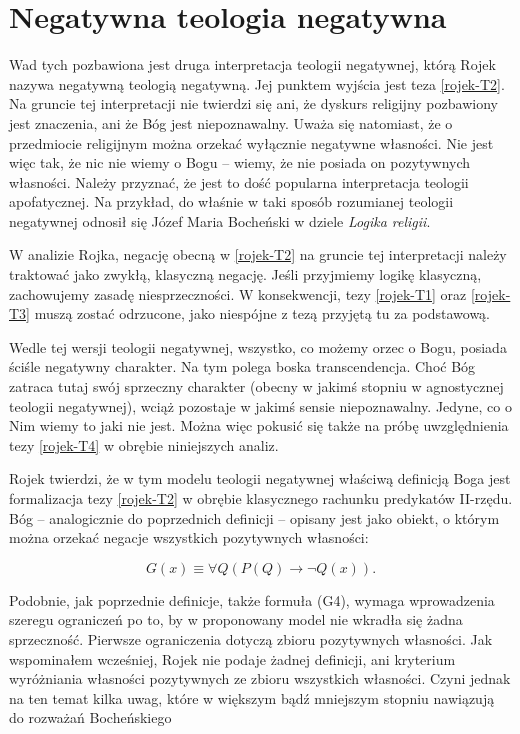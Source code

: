 \section{Negatywna teologia negatywna}

Wad tych pozbawiona jest druga interpretacja teologii negatywnej, którą
Rojek nazywa negatywną teologią negatywną. Jej punktem wyjścia jest
teza \eqref{rojek-T2}. Na gruncie tej interpretacji nie twierdzi się ani, że
dyskurs religijny pozbawiony jest znaczenia, ani że Bóg jest
niepoznawalny. Uważa się natomiast, że o przedmiocie religijnym można
orzekać wyłącznie negatywne własności. Nie jest więc tak, że nic nie
wiemy o Bogu -- wiemy, że nie posiada on pozytywnych własności. Należy
przyznać, że jest to dość popularna interpretacja teologii
apofatycznej. Na przykład, do właśnie w taki sposób rozumianej teologii
negatywnej odnosił się Józef Maria Bocheński w dziele \textit{Logika
religii}.

W analizie Rojka, negację obecną w \eqref{rojek-T2} na gruncie tej interpretacji
należy traktować jako zwykłą, klasyczną negację. Jeśli przyjmiemy
logikę klasyczną, zachowujemy zasadę niesprzeczności. W konsekwencji,
tezy \eqref{rojek-T1} oraz \eqref{rojek-T3} muszą zostać odrzucone, jako niespójne z tezą
przyjętą tu za podstawową.

Wedle tej wersji teologii negatywnej, wszystko, co możemy orzec o Bogu,
posiada ściśle negatywny charakter. Na tym polega boska transcendencja.
Choć Bóg zatraca tutaj swój sprzeczny charakter (obecny w jakimś
stopniu w agnostycznej teologii negatywnej), wciąż pozostaje w jakimś
sensie niepoznawalny. Jedyne, co o Nim wiemy to jaki nie jest. Można
więc pokusić się także na próbę uwzględnienia tezy \eqref{rojek-T4} w obrębie
niniejszych analiz.

Rojek twierdzi, że w tym modelu teologii negatywnej właściwą definicją
Boga jest formalizacja tezy \eqref{rojek-T2} w obrębie klasycznego rachunku
predykatów II-rzędu. Bóg -- analogicznie do poprzednich definicji –
opisany jest jako obiekt, o którym można orzekać negacje wszystkich
pozytywnych własności:


\begin{equation}\label{G4}\tag{G4}
    G(x) \equiv  \forall Q (P(Q) \to
\neg Q(x)).
\end{equation}





Podobnie, jak poprzednie definicje, także formuła (G4), wymaga
wprowadzenia szeregu ograniczeń po to, by w proponowany model nie
wkradła się żadna sprzeczność. Pierwsze ograniczenia dotyczą zbioru
pozytywnych własności. Jak wspominałem wcześniej, Rojek nie podaje
żadnej definicji, ani kryterium wyróżniania własności pozytywnych ze
zbioru wszystkich własności. Czyni jednak na ten temat kilka uwag,
które w większym bądź mniejszym stopniu nawiązują do rozważań
Bocheńskiego

